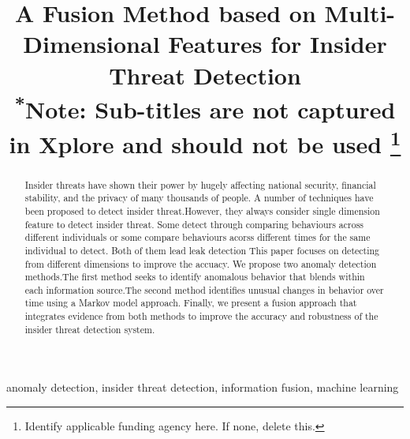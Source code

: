 \documentclass[conference]{IEEEtran}
\begin{document}
\title{A Fusion Method based on Multi-Dimensional Features for Insider Threat Detection\\
{\footnotesize \textsuperscript{*}Note: Sub-titles are not captured in Xplore and
should not be used}
\thanks{Identify applicable funding agency here. If none, delete this.}
}

\author{
\and
{}

}

\maketitle

\begin{abstract}

Insider threats have shown their power by hugely affecting national security, financial stability, and the privacy of many thousands of people.
A number of techniques have been proposed to detect insider threat.However, they always consider single dimension feature to detect insider threat. Some detect through comparing  behaviours across different individuals or some compare behaviours acorss different times for the same individual to detect. Both of them lead leak detection
This paper focuses on detecting from different dimensions to improve the accuacy.
We propose two anomaly detection methods.The first method seeks to identify anomalous behavior that blends within each information source.The second method identifies unusual changes in behavior over time using a Markov model approach. Finally, we present a fusion approach that integrates evidence from both methods to improve the accuracy and robustness of the insider threat detection system. 
\end{abstract}

\begin{IEEEkeywords}
anomaly detection, insider threat detection, information fusion, machine learning
\end{IEEEkeywords}
\end{document}
